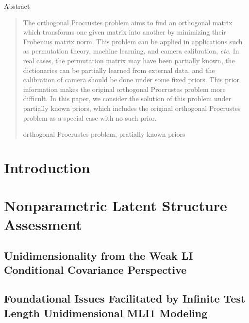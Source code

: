 \documentclass[titlepage,11pt,twoside]{article}
\begin{document}


\begin{center}\vskip3pt


\vspace{32pt}

Abstract\vskip3pt

\end{center}


\begin{abstract}
The orthogonal Procrustes problem aims to find an orthogonal matrix which transforms one given matrix into another by minimizing their Frobenius matrix norm. This problem can be applied in applications such as permutation theory, machine learning, and camera calibration, \emph{etc}. In real cases, the permutation matrix may have been partially known, the dictionaries can be partially learned from external data, and the calibration of camera should be done under some fixed priors. This prior information makes the original orthogonal Procrustes problem more difficult. In this paper, we consider the solution of this problem under partially known priors, which includes the original orthogonal Procrustes problem as a special case with no such prior.
\begin{keywords}
orthogonal Procrustes problem, pratially known priors
\end{keywords}
\end{abstract}

\vspace{\fill}\newpage

\section{Introduction}

\section{Nonparametric Latent Structure Assessment}


\subsection{Unidimensionality from the Weak LI Conditional Covariance Perspective}


\subsection{Foundational Issues Facilitated by Infinite Test Length Unidimensional MLI1 Modeling}
\end{document}

